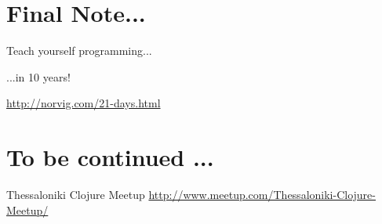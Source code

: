 \documentclass[10pt, compress]{beamer}
\begin{document}
\section{Final Note...}

\begin{frame}{Teach yourself programming...}

  \begin{center}

  \begin{huge} ...in 10 years! \end{huge}

  \url{http://norvig.com/21-days.html}

  \end{center}

\end{frame}

\section{To be continued ...}

\begin{frame}{Thessaloniki Clojure Meetup}
  \url{http://www.meetup.com/Thessaloniki-Clojure-Meetup/}
\end{frame}

\end{document}

